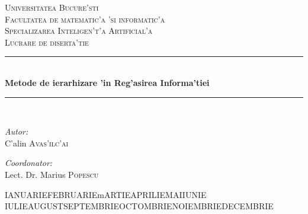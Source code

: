
\newcommand{\HRule}{\rule{\linewidth}{0.5mm}}

\def\today{\space  \ifcase \month
\or IANUARIE\or FEBRUARIE\or mARTIE\or APRILIE\or MAI\or IUNIE\or
IULIE\or AUGUST\or SEPTEMBRIE\or OCTOMBRIE\or NOIEMBRIE\or DECEMBRIE \fi
\space  \number\year}

\begin{titlepage}
\begin{center}
  
\textsc{\LARGE Universitatea Bucure'sti}\\
\textsc{\LARGE Facultatea de matematic'a 'si informatic'a}\\[0.5cm]
\textsc{\Large Specializarea Inteligen't'a Artificial'a}\\[1.5cm]
 

\textsc{\Large Lucrare de diserta'tie}\\[3.0cm]
 
 
\HRule \\[0.5cm]
{ \huge \bfseries Metode de ierarhizare 'in Reg'asirea Informa'tiei}\\[0.4cm]
\HRule \\[4.5cm]
 
\begin{minipage}{0.4\textwidth}
\begin{flushleft} \large
\emph{Autor:}\\
C'alin \textsc{Avas'ilc'ai}
\end{flushleft}
\end{minipage}
\begin{minipage}{0.4\textwidth}
\begin{flushright} \large
\emph{Coordonator:} \\
Lect. Dr. Marius \textsc{Popescu}
\end{flushright}
\end{minipage}
 
\vfill
 
{\large \today}
 
\end{center}
\end{titlepage}

